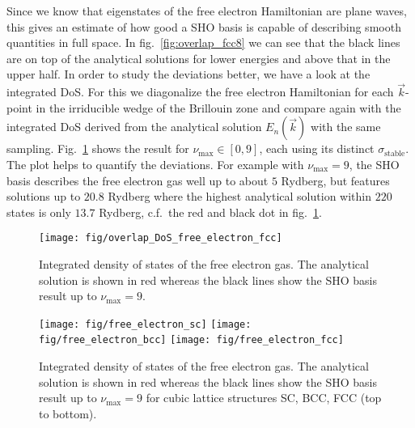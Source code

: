 \documentclass[oribibl]{llncs}
\newcommand{\um}[1]{_{\mathrm{#1}}}
\begin{document}
%
%
Since we know that eigenstates of the free electron Hamiltonian are plane waves,
this gives an estimate of how good a \ac{SHO} basis is capable of describing
smooth quantities in full space. 
In fig.~\ref{fig:overlap_fcc8} we can see that the black lines are on top of the 
analytical solutions for lower energies and above that in the upper half.
In order to study the deviations better,
we have a look at the integrated \ac{DoS}.
For this we diagonalize the free electron Hamiltonian for each $\vec k$-point
in the irriducible wedge of the Brillouin zone
and compare again with the integrated \ac{DoS} derived from the analytical solution $E_n(\vec k)$
with the same sampling.
Fig.~\ref{fig:overlap_DoS_free_electron_fcc} shows the result for $\nu\um{max} \in [0, 9]$,
each using its distinct $\sigma\um{stable}$.
The plot helps to quantify the deviations. For example with $\nu\um{max} = 9$, the \ac{SHO}
basis describes the free electron gas well up to about $5$ Rydberg, 
but features solutions up to $20.8$ Rydberg where the highest analytical solution
within $220$ states is only $13.7$ Rydberg,
c.f.~the red and black dot in fig.~\ref{fig:overlap_DoS_free_electron_fcc}.
%
\begin{figure}
  \begin{minipage}[c]{.990\textwidth}
	\texttt{[image: fig/overlap\_DoS\_free\_electron\_fcc]} %
  \end{minipage}\hfill
  \begin{minipage}[c]{.009\textwidth}
  \end{minipage}
  \label{fig:overlap_DoS_free_electron_fcc}
  \caption{
	Integrated density of states of the free electron gas. The analytical solution is shown in red
	whereas the black lines show the \ac{SHO} basis result up to $\nu\um{max} = 9$.
  }
\end{figure}
%
%
\begin{figure}
  \begin{minipage}[c]{.990\textwidth}
	\texttt{[image: fig/free\_electron\_sc]} %
	\texttt{[image: fig/free\_electron\_bcc]} %
	\texttt{[image: fig/free\_electron\_fcc]} %
  \end{minipage}\hfill
  \begin{minipage}[c]{.009\textwidth}
  \end{minipage}
  \label{fig:overlap_DoS_free_electron_cubic_lattices}
  \caption{
	Integrated density of states of the free electron gas. The analytical solution is shown in red
	whereas the black lines show the \ac{SHO} basis result up to $\nu\um{max} = 9$ 
	for cubic lattice structures SC, BCC, FCC (top to bottom).
  }
\end{figure}
%
%
\end{document}
